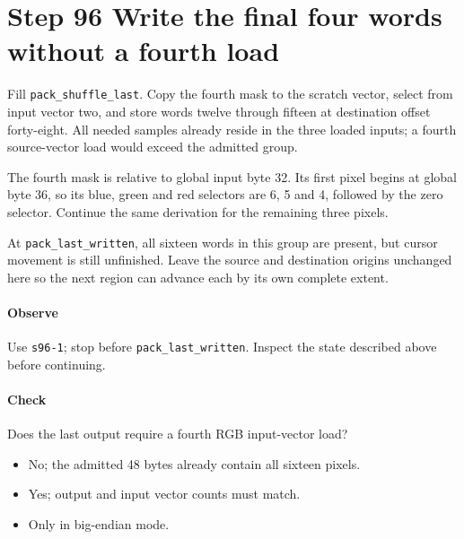 \section{Step 96 Write the final four words without a fourth load}
Fill \texttt{pack\_shuffle\_last}. Copy the fourth mask to the scratch vector, select from input vector two, and store words twelve through fifteen at destination offset forty-eight. All needed samples already reside in the three loaded inputs; a fourth source-vector load would exceed the admitted group.

The fourth mask is relative to global input byte 32. Its first pixel begins at global byte 36, so its blue, green and red selectors are 6, 5 and 4, followed by the zero selector. Continue the same derivation for the remaining three pixels.

At \texttt{pack\_last\_written}, all sixteen words in this group are present, but cursor movement is still unfinished. Leave the source and destination origins unchanged here so the next region can advance each by its own complete extent.

\paragraph{Observe} Use \texttt{s96-1}; stop before \texttt{pack\_last\_written}. Inspect the state described above before continuing.

\paragraph{Check} Does the last output require a fourth RGB input-vector load?
\begin{itemize}
  \item[A.] No; the admitted 48 bytes already contain all sixteen pixels.
  \item[B.] Yes; output and input vector counts must match.
  \item[C.] Only in big-endian mode.
\end{itemize}
